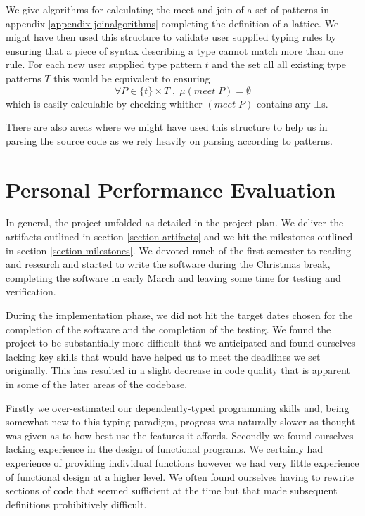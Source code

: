 We give algorithms for calculating the meet and join of a set of
patterns in appendix \ref{appendix-joinalgorithms} completing the
definition of a lattice. We might have then used this structure to
validate user supplied typing rules by ensuring that a piece of syntax
describing a type cannot match more than one rule. For each new user
supplied type pattern $t$ and the set all all existing type patterns $T$
this would be equivalent to ensuring
$$
\forall P \in \{t\} × T \;,\; \mu (meet \; P) = \emptyset
$$
which is easily calculable by checking whither $(meet \; P)$ contains
any $\bot$s.

There are also areas where we might have used this structure to help
us in parsing the source code as we rely heavily on parsing according
to patterns.

\section{Personal Performance Evaluation}

In general, the project unfolded as detailed in the project plan. We
deliver the artifacts outlined in section \ref{section-artifacts} and we
hit the milestones outlined in section \ref{section-milestones}. We
devoted much of the first semester to reading and research and started
to write the software during the Christmas break, completing the
software in early March and leaving some time for testing and verification.

During the implementation phase, we did not hit the target
dates chosen for the completion of the software and the completion of
the testing. We found the project to be substantially more difficult
that we anticipated and found ourselves lacking key skills that would
have helped us to meet the deadlines we set originally. This has
resulted in a slight decrease in code quality that is apparent in some
of the later areas of the codebase.

Firstly we over-estimated our dependently-typed programming skills and,
being somewhat new to this typing paradigm, progress was naturally
slower as thought was given as to how best use the features it
affords. Secondly we found ourselves lacking experience in the design
of functional programs. We certainly had experience of providing
individual functions however we had very little experience of
functional design at a higher level. We often found ourselves having
to rewrite sections of code that seemed sufficient at the time but
that made subsequent definitions prohibitively difficult.

